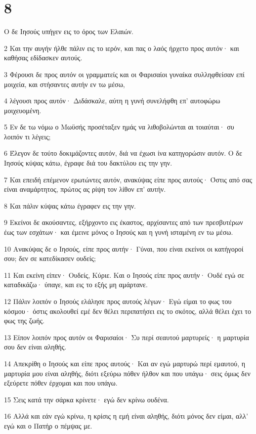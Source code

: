 \chapter{8}

\par Ο δε Ιησούς υπήγεν εις το όρος των Ελαιών.
\par 2 Και την αυγήν ήλθε πάλιν εις το ιερόν, και πας ο λαός ήρχετο προς αυτόν· και καθήσας εδίδασκεν αυτούς.
\par 3 Φέρουσι δε προς αυτόν οι γραμματείς και οι Φαρισαίοι γυναίκα συλληφθείσαν επί μοιχεία, και στήσαντες αυτήν εν τω μέσω,
\par 4 λέγουσι προς αυτόν· Διδάσκαλε, αύτη η γυνή συνελήφθη επ' αυτοφώρω μοιχευομένη.
\par 5 Εν δε τω νόμω ο Μωϋσής προσέταξεν ημάς να λιθοβολώνται αι τοιαύται· συ λοιπόν τι λέγεις;
\par 6 Έλεγον δε τούτο δοκιμάζοντες αυτόν, διά να έχωσι ίνα κατηγορώσιν αυτόν. Ο δε Ιησούς κύψας κάτω, έγραφε διά του δακτύλου εις την γην.
\par 7 Και επειδή επέμενον ερωτώντες αυτόν, ανακύψας είπε προς αυτούς· Όστις από σας είναι αναμάρτητος, πρώτος ας ρίψη τον λίθον επ' αυτήν.
\par 8 Και πάλιν κύψας κάτω έγραφεν εις την γην.
\par 9 Εκείνοι δε ακούσαντες, εξήρχοντο εις έκαστος, αρχίσαντες από των πρεσβυτέρων έως των εσχάτων· και έμεινε μόνος ο Ιησούς και η γυνή ισταμένη εν τω μέσω.
\par 10 Ανακύψας δε ο Ιησούς, είπε προς αυτήν· Γύναι, που είναι εκείνοι οι κατήγοροί σου; δεν σε κατεδίκασεν ουδείς;
\par 11 Και εκείνη είπεν· Ουδείς, Κύριε. Και ο Ιησούς είπε προς αυτήν· Ουδέ εγώ σε καταδικάζω· ύπαγε, και εις το εξής μη αμάρτανε.
\par 12 Πάλιν λοιπόν ο Ιησούς ελάλησε προς αυτούς λέγων· Εγώ είμαι το φως του κόσμου· όστις ακολουθεί εμέ δεν θέλει περιπατήσει εις το σκότος, αλλά θέλει έχει το φως της ζωής.
\par 13 Είπον λοιπόν προς αυτόν οι Φαρισαίοι· Συ περί σεαυτού μαρτυρείς· η μαρτυρία σου δεν είναι αληθής.
\par 14 Απεκρίθη ο Ιησούς και είπε προς αυτούς· Και αν εγώ μαρτυρώ περί εμαυτού, η μαρτυρία μου είναι αληθής, διότι εξεύρω πόθεν ήλθον και που υπάγω· σεις όμως δεν εξεύρετε πόθεν έρχομαι και που υπάγω.
\par 15 Σεις κατά την σάρκα κρίνετε· εγώ δεν κρίνω ουδένα.
\par 16 Αλλά και εάν εγώ κρίνω, η κρίσις η εμή είναι αληθής, διότι μόνος δεν είμαι, αλλ' εγώ και ο Πατήρ ο πέμψας με.
